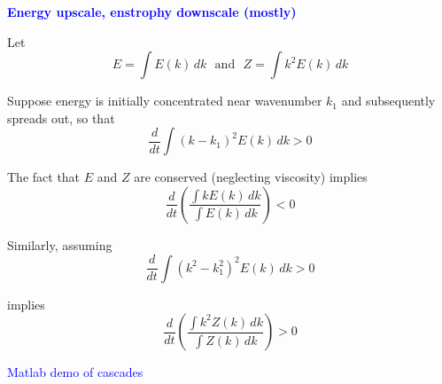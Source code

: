 \documentclass[a4]{seminar}
\newcommand{\B}[1]{\textcolor{blue}{#1}}
\begin{document}
\begin{slide}

\B{\bf Energy upscale, enstrophy downscale (mostly)}

Let
\begin{displaymath}
E = \int E(k) \, dk \ \ \ \mathrm{and} \ \ \ Z = \int k^2 E(k) \, dk
\end{displaymath}

Suppose energy is initially concentrated near wavenumber \( k_1 \) and
subsequently spreads out, so that
\begin{displaymath}
\frac{d}{dt} \int (k - k_1)^2 E(k) \, dk > 0
\end{displaymath}

The fact that \( E \) and \( Z \) are conserved (neglecting viscosity)
implies
\begin{displaymath}
\frac{d}{dt} \left( \frac{\int k E(k) \, dk}{\int E(k) \, dk} \right) < 0
\end{displaymath}


\end{slide}


\begin{slide}

Similarly, assuming
\begin{displaymath}
\frac{d}{dt} \int (k^2 - k_1^2)^2 E(k) \, dk > 0
\end{displaymath}

implies
\begin{displaymath}
\frac{d}{dt} \left( \frac{\int k^2 Z(k) \, dk}{\int Z(k) \, dk} \right) > 0
\end{displaymath}



\end{slide}


\begin{slide}

\begin{center}
\B{Matlab demo of cascades}
\end{center}

\end{slide}


\end{document}
